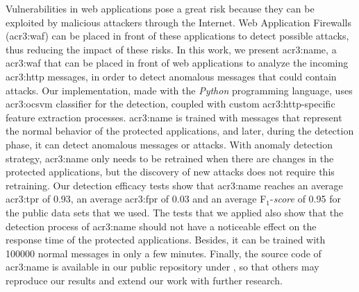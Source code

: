 \begin{abstracts}
    Vulnerabilities in web applications pose a great risk because they
    can be exploited by malicious attackers through the Internet. Web
    Application Firewalls (\gls{acr3:waf}) can be placed in front of
    these applications to detect possible attacks, thus reducing the
    impact of these risks.
    In this work, we present \gls{acr3:name}, a \gls{acr3:waf} that can
    be placed in front of web applications to analyze the incoming
    \gls{acr3:http} messages, in order to detect anomalous messages that
    could contain attacks.
    Our implementation, made with the \textit{Python} programming language,
    uses \gls{acr3:ocsvm} classifier for the detection, coupled with custom
    \gls{acr3:http}-specific feature extraction processes.
    \gls{acr3:name} is trained with messages that represent the normal
    behavior of the protected applications, and later, during the detection
    phase, it can detect anomalous messages or attacks.
    With anomaly detection strategy, \gls{acr3:name} only needs to be
    retrained when there are changes in the protected applications, but
    the discovery of new attacks does not require this retraining.
    Our detection efficacy tests show that \gls{acr3:name} reaches an
    average \gls{acr3:tpr} of \num{0.93}, an average \gls{acr3:fpr} of
    \num{0.03} and an average F$_{1}$-\textit{score} of \num{0.95} for
    the public data sets that we used.
    The tests that we applied also show that the detection process of
    \gls{acr3:name} should not have a noticeable effect on the response
    time of the protected applications. Besides, it can be trained with
    \num{100000} normal messages in only a few minutes.
    Finally, the source code of \gls{acr3:name} is available in our
    public repository under \TheRepoUrl, so that others may reproduce
    our results and extend our work with further research.

\end{abstracts}
